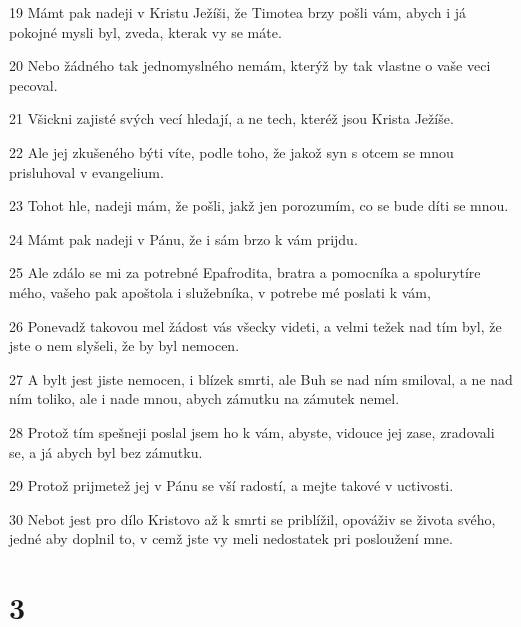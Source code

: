 \par 19 Mámt pak nadeji v Kristu Ježíši, že Timotea brzy pošli vám, abych i já pokojné mysli byl, zveda, kterak vy se máte.
\par 20 Nebo žádného tak jednomyslného nemám, kterýž by tak vlastne o vaše veci pecoval.
\par 21 Všickni zajisté svých vecí hledají, a ne tech, kteréž jsou Krista Ježíše.
\par 22 Ale jej zkušeného býti víte, podle toho, že jakož syn s otcem se mnou prisluhoval v evangelium.
\par 23 Tohot hle, nadeji mám, že pošli, jakž jen porozumím, co se bude díti se mnou.
\par 24 Mámt pak nadeji v Pánu, že i sám brzo k vám prijdu.
\par 25 Ale zdálo se mi za potrebné Epafrodita, bratra a pomocníka a spolurytíre mého, vašeho pak apoštola i služebníka, v potrebe mé poslati k vám,
\par 26 Ponevadž takovou mel žádost vás všecky videti, a velmi težek nad tím byl, že jste o nem slyšeli, že by byl nemocen.
\par 27 A bylt jest jiste nemocen, i blízek smrti, ale Buh se nad ním smiloval, a ne nad ním toliko, ale i nade mnou, abych zámutku na zámutek nemel.
\par 28 Protož tím spešneji poslal jsem ho k vám, abyste, vidouce jej zase, zradovali se, a já abych byl bez zámutku.
\par 29 Protož prijmetež jej v Pánu se vší radostí, a mejte takové v uctivosti.
\par 30 Nebot jest pro dílo Kristovo až k smrti se priblížil, opováživ se života svého, jedné aby doplnil to, v cemž jste vy meli nedostatek pri posloužení mne.

\chapter{3}

